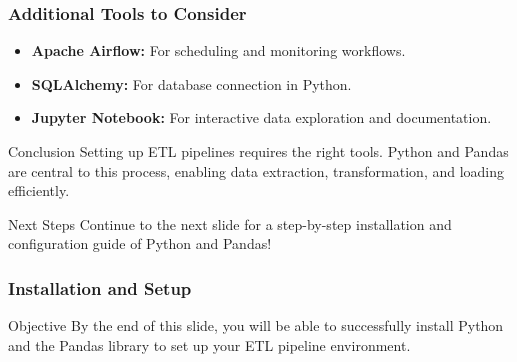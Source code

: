 \documentclass[aspectratio=169]{beamer}
\begin{document}
\begin{frame}[fragile]
    \frametitle{Additional Tools to Consider}
    \begin{itemize}
        \item \textbf{Apache Airflow:} For scheduling and monitoring workflows.
        \item \textbf{SQLAlchemy:} For database connection in Python.
        \item \textbf{Jupyter Notebook:} For interactive data exploration and documentation.
    \end{itemize}
    
    \begin{block}{Conclusion}
        Setting up ETL pipelines requires the right tools. Python and Pandas are central to this process, enabling data extraction, transformation, and loading efficiently.
    \end{block}

    \begin{block}{Next Steps}
        Continue to the next slide for a step-by-step installation and configuration guide of Python and Pandas!
    \end{block}
\end{frame}

\begin{frame}
    \frametitle{Installation and Setup}
    \begin{block}{Objective}
        By the end of this slide, you will be able to successfully install Python and the Pandas library to set up your ETL pipeline environment.
    \end{block}
\end{frame}
\end{document}
